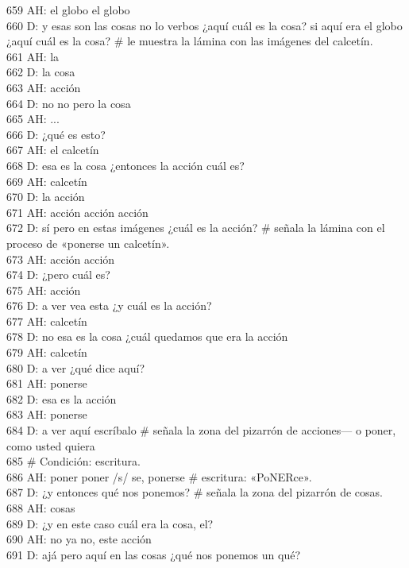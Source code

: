 659 AH: el globo el globo\\
660 D: y esas son las cosas no lo verbos ¿aquí cuál es la cosa? si aquí era el globo ¿aquí cuál es la cosa? \# le muestra la lámina con las imágenes del calcetín.\\
661 AH: la\\
662 D: la cosa\\
663 AH: acción\\
664 D: no no pero la cosa\\
665 AH: ...\\
666 D: ¿qué es esto?\\
667 AH: el calcetín\\
668 D: esa es la cosa ¿entonces la acción cuál es?\\
669 AH: calcetín\\
670 D: la acción\\
671 AH: acción acción acción\\
672 D: sí pero en estas imágenes ¿cuál es la acción? \# señala la lámina con el proceso de «ponerse un calcetín».\\
673 AH: acción acción\\
674 D: ¿pero cuál es?\\
675 AH: acción\\
676 D: a ver vea esta ¿y cuál es la acción?\\
677 AH: calcetín\\
678 D: no esa es la cosa ¿cuál quedamos que era la acción\\
679 AH: calcetín\\
680 D: a ver ¿qué dice aquí?\\
681 AH: ponerse\\
682 D: esa es la acción\\
683 AH: ponerse\\
684 D: a ver aquí escríbalo \# señala la zona del pizarrón de acciones--- o poner, como usted quiera\\
685 \# Condición: escritura.\\
686 AH: poner poner /s/ se, ponerse \# escritura: «PoNERce».\\
687 D: ¿y entonces qué nos ponemos? \# señala la zona del pizarrón de cosas.\\
688 AH: cosas\\
689 D: ¿y en este caso cuál era la cosa, el?\\
690 AH: no ya no, este acción\\
691 D: ajá pero aquí en las cosas ¿qué nos ponemos un qué?\\
